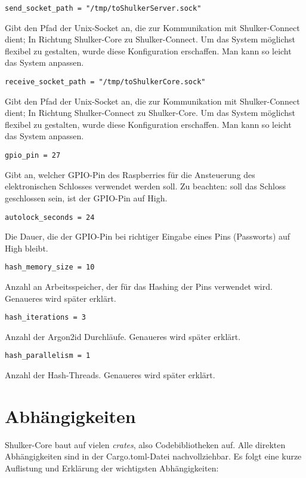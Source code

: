 \lstinline{send_socket_path = "/tmp/toShulkerServer.sock"}

Gibt den Pfad der Unix-Socket an, die zur Kommunikation mit Shulker-Connect dient; In Richtung Shulker-Core zu Shulker-Connect.
Um das System möglichst flexibel zu gestalten, wurde diese Konfiguration erschaffen. Man kann so leicht das System anpassen.

\lstinline{receive_socket_path = "/tmp/toShulkerCore.sock"}

Gibt den Pfad der Unix-Socket an, die zur Kommunikation mit Shulker-Connect dient; In Richtung Shulker-Connect zu Shulker-Core.
Um das System möglichst flexibel zu gestalten, wurde diese Konfiguration erschaffen. Man kann so leicht das System anpassen.

\lstinline{gpio_pin = 27}

Gibt an, welcher GPIO-Pin des Raspberries für die Ansteuerung des elektronischen Schlosses verwendet werden soll. Zu beachten:
soll das Schloss geschlossen sein, ist der GPIO-Pin auf High.

\lstinline{autolock_seconds = 24}

Die Dauer, die der GPIO-Pin bei richtiger Eingabe eines Pins (Passworts) auf High bleibt.

\lstinline{hash_memory_size = 10}

Anzahl an Arbeitsspeicher, der für das Hashing der Pins verwendet wird. Genaueres wird später erklärt.

\lstinline{hash_iterations = 3}

Anzahl der Argon2id Durchläufe. Genaueres wird später erklärt.

\lstinline{hash_parallelism = 1}

Anzahl der Hash-Threads. Genaueres wird später erklärt.


\section{Abhängigkeiten}
Shulker-Core baut auf vielen \textit{crates}, also Codebibliotheken auf. Alle direkten Abhängigkeiten sind in der 
Cargo.toml-Datei nachvollziehbar. Es folgt eine kurze Auflistung und Erklärung der wichtigsten Abhängigkeiten:

